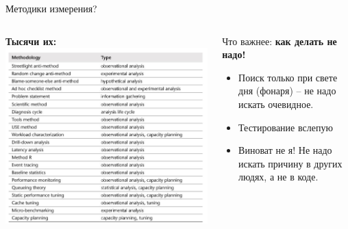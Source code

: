 \begin{frame}{Методики измерения?}
	\begin{columns}
		\begin{column}{.5\textwidth}
			\textbf{Тысячи их:}
			\includegraphics[width=\textwidth]{img/methodology.png}
		\end{column}
		\begin{column}{.5\textwidth}
			Что важнее: \textbf{как делать не надо!}
			\begin{itemize}
				\item Поиск только при свете дня (фонаря) -- не надо искать очевидное.
				\item Тестирование вслепую
				\item Виноват не я! Не надо искать причину в других людях, а не в коде.
			\end{itemize}
		\end{column}
	\end{columns}

\end{frame}

